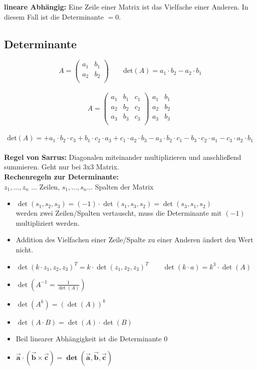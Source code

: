 
\textbf{lineare Abhängig:} Eine Zeile einer Matrix ist das Vielfache einer Anderen. In diesem Fall ist die Determinante $=0$.\\

\subsection{Determinante}
\[A=\begin{pmatrix}
 a_1 & b_1 \\
 a_2 & b_2 \\
\end{pmatrix}\qquad \text{det}(A)=a_1 \cdot b_2 - a_2 \cdot b_1\]
\ \\
\[A=\begin{pmatrix}
 a_1 & b_1 & c_1 \\
 a_2 & b_2 & c_2 \\
 a_3 & b_3 & c_3 \\
\end{pmatrix}
\begin{matrix}
 a_1 & b_1 \\
 a_2 & b_2 \\
 a_3 & b_3 \\
\end{matrix}\]
\ \\
\[\text{det}(A)= + a_1 \cdot b_2 \cdot c_3 + b_1 \cdot c_2 \cdot a_3 + c_1 \cdot a_2 \cdot b_3 - a_3 \cdot b_2 \cdot c_1 - b_3 \cdot c_2 \cdot a_1 - c_3 \cdot a_2 \cdot b_1\]
\ \\
\textbf{Regel von Sarrus:} Diagonalen miteinander multiplizieren und anschließend summieren. Geht nur bei 3x3 Matrix.\\

\textbf{Rechenregeln zur Determinante:}\\
$z_1,...,z_n$ ... Zeilen, $s_1,...,s_n$... Spalten der Matrix
\begin{itemize}
    \item $\det(s_1,s_2,s_3) = (-1)\cdot \det (s_1,s_3,s_2) = \det(s_3,s_1,s_2)$\\
    werden zwei Zeilen/Spalten vertauscht, muss die Determinante mit $(-1)$ multipliziert werden.
    \item Addition des Vielfachen einer Zeile/Spalte zu einer Anderen ändert den Wert nicht.
    \item $\det(k\cdot z_1,z_2,z_3)^T = k \cdot \det(z_1,z_2,z_3)^T \qquad \det(k\cdot a) = k^3\cdot  \det(A)$
    \item $\det(A^{-1} = \frac{1}{\det(A)})$
    \item $\det(A^k) = (\det(A))^k$
    \item $\det(A\cdot B) = \det (A)\cdot \det(B)$
    \item Beil linearer Abhängigkeit ist die Determinante 0
    \item $\bm{\vec{a}\cdot (\vec{b}\times \vec{c})=\det(\vec{a}, \vec{b}, \vec{c})}$
\end{itemize}

